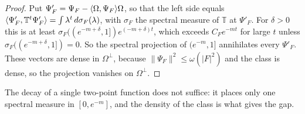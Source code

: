 \begin{proof}
Put $\Psi'_F=\Psi_F-\langle \Omega,\Psi_F\rangle\Omega$, so that the left side equals
$\langle \Psi'_F,\mathbb T^t\Psi'_F\rangle=\int\lambda^t\,d\sigma_F(\lambda)$, with
$\sigma_F$ the spectral measure of $\mathbb T$ at $\Psi'_F$. For $\delta>0$
this is at least $\sigma_F((e^{-m+\delta},1])e^{(-m+\delta)t}$, which exceeds
$C_Fe^{-mt}$ for large $t$ unless $\sigma_F((e^{-m+\delta},1])=0$. So the
spectral projection of $(e^{-m},1]$ annihilates every $\Psi'_F$. These vectors
are dense in $\Omega^\perp$, because $\|\Psi_F\|^2\le\omega(|F|^2)$ and the
class is dense, so the projection vanishes on $\Omega^\perp$.
\end{proof}

The decay of a single two-point function does not suffice: it places only
one spectral measure in $[0,e^{-m}]$, and the density of the class is what
gives the gap.

